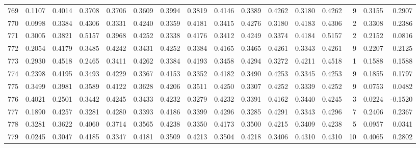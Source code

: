 \begin{tabular}{lrrrrrrrrrrrrrrr}
769 &      0.1107 &  0.4014 &  0.3708 &  0.3706 &  0.3609 &  0.3994 &  0.3819 &  0.4146 &  0.3389 &  0.4262 &   0.3180 &     0.4262 &      9 &                    0.3155 &                     0.2907 \\
770 &      0.0998 &  0.3384 &  0.4306 &  0.3331 &  0.4240 &  0.3359 &  0.4181 &  0.3415 &  0.4276 &  0.3180 &   0.4183 &     0.4306 &      2 &                    0.3308 &                     0.2386 \\
771 &      0.3005 &  0.3821 &  0.5157 &  0.3968 &  0.4252 &  0.3338 &  0.4176 &  0.3412 &  0.4249 &  0.3374 &   0.4184 &     0.5157 &      2 &                    0.2152 &                     0.0816 \\
772 &      0.2054 &  0.4179 &  0.3485 &  0.4242 &  0.3431 &  0.4252 &  0.3384 &  0.4165 &  0.3465 &  0.4261 &   0.3343 &     0.4261 &      9 &                    0.2207 &                     0.2125 \\
773 &      0.2930 &  0.4518 &  0.2465 &  0.3411 &  0.4262 &  0.3384 &  0.4193 &  0.3458 &  0.4294 &  0.3272 &   0.4211 &     0.4518 &      1 &                    0.1588 &                     0.1588 \\
774 &      0.2398 &  0.4195 &  0.3493 &  0.4229 &  0.3367 &  0.4153 &  0.3352 &  0.4182 &  0.3490 &  0.4253 &   0.3345 &     0.4253 &      9 &                    0.1855 &                     0.1797 \\
775 &      0.3499 &  0.3981 &  0.3589 &  0.4122 &  0.3628 &  0.4206 &  0.3511 &  0.4250 &  0.3307 &  0.4252 &   0.3339 &     0.4252 &      9 &                    0.0753 &                     0.0482 \\
776 &      0.4021 &  0.2501 &  0.3442 &  0.4245 &  0.3433 &  0.4232 &  0.3279 &  0.4232 &  0.3391 &  0.4162 &   0.3440 &     0.4245 &      3 &                    0.0224 &                    -0.1520 \\
777 &      0.1890 &  0.4257 &  0.3281 &  0.4280 &  0.3393 &  0.4186 &  0.3399 &  0.4296 &  0.3285 &  0.4291 &   0.3343 &     0.4296 &      7 &                    0.2406 &                     0.2367 \\
778 &      0.3281 &  0.3622 &  0.4060 &  0.3714 &  0.3565 &  0.4238 &  0.3350 &  0.4173 &  0.3500 &  0.4215 &   0.3409 &     0.4238 &      5 &                    0.0957 &                     0.0341 \\
779 &      0.0245 &  0.3047 &  0.4185 &  0.3347 &  0.4181 &  0.3509 &  0.4213 &  0.3504 &  0.4218 &  0.3406 &   0.4310 &     0.4310 &     10 &                    0.4065 &                     0.2802 \\

\end{tabular}
